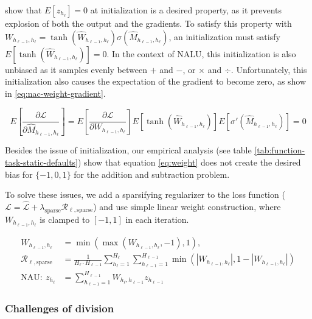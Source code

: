 \citet{glorot-initialization} show that $E[z_{h_\ell}] = 0$ at initialization is a desired property, as it prevents explosion of both the output and the gradients. To satisfy this property with $W_{h_{\ell-1},h_\ell} = \tanh(\hat{W}_{h_{\ell-1},h_\ell}) \sigma(\hat{M}_{h_{\ell-1},h_\ell})$, an initialization must satisfy $E[\tanh(\hat{W}_{h_{\ell-1},h_\ell})] = 0$. In the context of NALU, this initialization is also unbiased as it samples evenly between $+$ and $-$, or $\times$ and $\div$. Unfortunately, this initialization also causes the expectation of the gradient to become zero, as show in \eqref{eq:nac-weight-gradient}.

\begin{equation}
E\left[\frac{\partial \mathcal{L}}{\partial \hat{M}_{h_{\ell-1},h_\ell}}\right] = E\left[\frac{\partial \mathcal{L}}{\partial W_{h_{\ell-1},h_\ell}}\right] E\left[\tanh(\hat{W}_{h_{\ell-1},h_\ell})\right] E\left[\sigma'(\hat{M}_{h_{\ell-1},h_\ell})\right] = 0
\label{eq:nac-weight-gradient}
\end{equation}

Besides the issue of initialization, our empirical analysis (see table \ref{tab:function-task-static-defaults}) show that equation \ref{eq:weight} does not create the desired bias for $\{-1, 0, 1\}$ for the addition and subtraction problem.

To solve these issues, we add a sparsifying regularizer to the loss function ($\mathcal{L} = \hat{\mathcal{L}} + \lambda_{\mathrm{sparse}} \mathcal{R}_{\ell,\mathrm{sparse}}$) and use simple linear weight construction, where $W_{h_{\ell-1},h_\ell}$ is clamped to $[-1, 1]$ in each iteration.

\begin{align}
W_{h_{\ell-1},h_\ell} &= \min(\max(W_{h_{\ell-1},h_\ell}, -1), 1), \\
\mathcal{R}_{\ell,\mathrm{sparse}} &= \frac{1}{H_\ell \cdot H_{\ell-1}} \sum_{h_\ell=1}^{H_\ell} \sum_{h_{\ell-1}=1}^{H_{\ell-1}} \min\left(|W_{h_{\ell-1},h_\ell}|, 1 - \left|W_{h_{\ell-1},h_\ell}\right|\right) \\
\textrm{NAU}:\ z_{h_\ell} &= \sum_{h_{\ell-1}=1}^{H_{\ell-1}} W_{h_{\ell}, h_{\ell-1}} z_{h_{\ell-1}}
\end{align}

\subsubsection{Challenges of division} \label{sssec:nac-mul}

